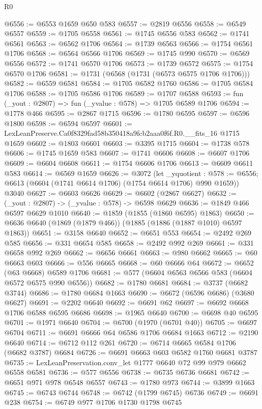 \begin{lexlean}{R0}
\begin{coremodule}
@6556 := @6553 @1659 @650 @583
@6557 := @2819 @6556
@6558 := @6549 @6557
@6559 := @1705 @6558
@6561 := @1745 @6556 @583
@6562 := @1741 @6561
@6563 := @6562 @1706
@6564 := @1739 @6563
@6566 := @1754 @6561 @1706
@6568 := @6564 @6566 @1706
@6569 := @1745 @990
@6570 := @6569 @6556
@6572 := @1741 @6570 @1706
@6573 := @1739 @6572
@6575 := @1754 @6570 @1706
@6581 := @1731 (@6568 (@1731 (@6573 @6575 @1706 @1706)))
@6582 := @6559 @6581
@6584 := @1705 @6582 @1760
@6586 := @1705 @6584 @1706
@6588 := @1705 @6586 @1706
@6589 := @1707 @6588
@6593 := fun (_yout : @2807) => fun (_yvalue : @578) => @1705 @6589 @1706
@6594 := @1778 @466
@6595 := @2867 @1715
@6596 := @1780 @6595
@6597 := @6596 @1800
@6598 := @6594 @6597
@6601 := LexLeanPreserve.Ca0f8329fad58b350418a9fcb2aaa0f6f.R0.__fits_16 @1715 @1659
@6602 := @1803 @6601
@6603 := @3395 @1715
@6604 := @1738 @578
@6606 := @1745 @1659 @583
@6607 := @1741 @6606
@6608 := @6607 @1706
@6609 := @6604 @6608
@6611 := @1754 @6606 @1706
@6613 := @6609 @6611 @583
@6614 := @6569 @1659
@6626 := @3072
    (let _yquotient : @578 := @6556;
    @6613 (@6604 (@1741 @6614 @1706) (@1754 @6614 @1706) @990 @1659))
    @3040
@6627 := @6603 @6626
@6629 := @6602 (@2867 @6627)
@6632 := (_yout : @2807) -> (_yvalue : @578) -> @6598 @6629
@6636 := @1849 @466 @6597 @6629 @1010
@6640 := @1859 (@1855 (@1860 @6595) @1863)
@6650 := @6636 @6640 (@1869 (@1879 @466)) (@1885 (@1886 (@1887 @1010) @6597 @1863))
@6651 := @3158 @6640
@6652 := @6651 @553
@6654 := @2492 @269 @585
@6656 := @331 @6654 @585
@6658 := @2492 @992 @269
@6661 := @331 @6658 @992 @269
@6662 := @6656 @6661
@6663 := @980 @6662
@6665 := @60 @6663 @603
@6666 := @556 @6665
@6668 := @60 @6666 @64
@6672 := @6652 (@63 @6668) @6589 @1706
@6681 := @577 (@6604 @6563 @6566 @583 (@6604 @6572 @6575 @990 @6556))
@6682 := @1780 @6681
@6684 := @3737 (@6682 @3744)
@6686 := @1780 @6684 @1663
@6690 := @6672 (@6596 @6686) (@3680 @6627)
@6691 := @2202 @6640
@6692 := @6691 @62
@6697 := @6692 @6668 @1706 @6588 @6595 @6686
@6698 := @1965 @6640
@6700 := @6698 @40 @6595
@6701 := @1971 @6640
@6704 := @6700 (@1970 (@6701 @40))
@6705 := @6697 @6704
@6711 := @6691 @6666 @64 @6586 @1706 @6684 @1663
@6712 := @2190 @6640
@6714 := @6712 @112 @261
@6720 := @6714 @6665 @6584 @1706 (@6682 @3787) @6684
@6726 := @6691 @6663 @603 @6582 @1760 @6681 @3787
@6735 := LexLeanPreservation.conv_let @1777 @6640 @72 @99 @979 @6662 @6558 @6581
@6736 := @577 @6556
@6738 := @6735 @6736 @6681
@6742 := @6651 @971 @978 @6548 @6557
@6743 := @1780 @973
@6744 := @3899 @1663
@6745 := @6743 @6744
@6748 := @6742 (@1799 @6745) @6736
@6749 := @6691 @238
@6754 := @6749 @977 @1706 @1730 @1798 @6745

\end{coremodule}
\end{lexlean}

